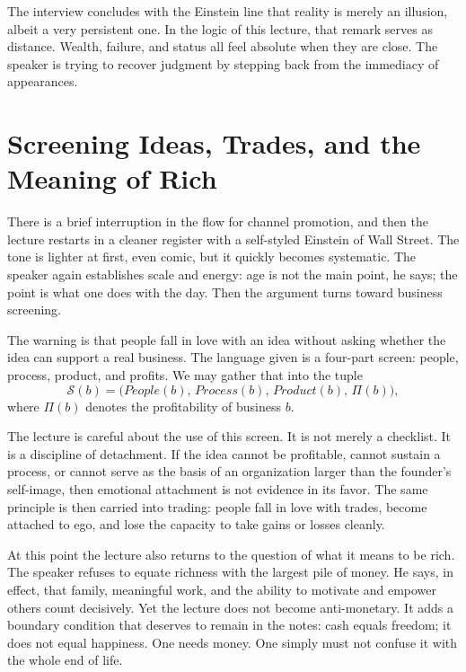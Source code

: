 The interview concludes with the Einstein line that reality is merely an illusion, albeit a very persistent one. In the logic of this lecture, that remark serves as distance. Wealth, failure, and status all feel absolute when they are close. The speaker is trying to recover judgment by stepping back from the immediacy of appearances.

\section{Screening Ideas, Trades, and the Meaning of Rich}

There is a brief interruption in the flow for channel promotion, and then the lecture restarts in a cleaner register with a self-styled Einstein of Wall Street. The tone is lighter at first, even comic, but it quickly becomes systematic. The speaker again establishes scale and energy: age is not the main point, he says; the point is what one does with the day. Then the argument turns toward business screening.

The warning is that people fall in love with an idea without asking whether the idea can support a real business. The language given is a four-part screen: people, process, product, and profits. We may gather that into the tuple
\begin{equation}
\mathcal{S}(b)=\bigl(People(b),\,Process(b),\,Product(b),\,\Pi(b)\bigr),
\end{equation}
where \(\Pi(b)\) denotes the profitability of business \(b\).

The lecture is careful about the use of this screen. It is not merely a checklist. It is a discipline of detachment. If the idea cannot be profitable, cannot sustain a process, or cannot serve as the basis of an organization larger than the founder's self-image, then emotional attachment is not evidence in its favor. The same principle is then carried into trading: people fall in love with trades, become attached to ego, and lose the capacity to take gains or losses cleanly.

At this point the lecture also returns to the question of what it means to be rich. The speaker refuses to equate richness with the largest pile of money. He says, in effect, that family, meaningful work, and the ability to motivate and empower others count decisively. Yet the lecture does not become anti-monetary. It adds a boundary condition that deserves to remain in the notes: cash equals freedom; it does not equal happiness. One needs money. One simply must not confuse it with the whole end of life.

